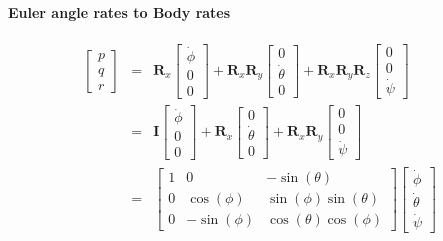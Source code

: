 \documentclass[a4paper,12pt]{article}
\begin{document}
\paragraph{Euler angle rates to Body rates}
\begin{equation} \nonumber
    \begin{aligned}
        \begin{bmatrix}
            p \\
            q \\
            r
        \end{bmatrix} & = &
        \mathbf{R}_x
        \begin{bmatrix}
            \dot{\phi} \\
            0 \\
            0
        \end{bmatrix} +
        \mathbf{R}_x
        \mathbf{R}_y
        \begin{bmatrix}
            0 \\
            \dot{\theta} \\
            0
        \end{bmatrix} +
        \mathbf{R}_x
        \mathbf{R}_y
        \mathbf{R}_z
        \begin{bmatrix}
            0 \\
            0 \\
            \dot{\psi}
        \end{bmatrix} \\
         & = &
        \mathbf{I}
        \begin{bmatrix}
            \dot{\phi} \\
            0 \\
            0
        \end{bmatrix} +
        \mathbf{R}_x
        \begin{bmatrix}
            0 \\
            \dot{\theta} \\
            0
        \end{bmatrix} +
        \mathbf{R}_x
        \mathbf{R}_y
        \begin{bmatrix}
            0 \\
            0 \\
            \dot{\psi}
        \end{bmatrix} \\
        & = & \begin{bmatrix}
            1 & 0 & -\sin(\theta) \\
            0 & \cos(\phi)  & \sin(\phi) \sin(\theta) \\
            0 & -\sin(\phi)          & \cos(\theta)\cos(\phi)
        \end{bmatrix}
        \begin{bmatrix}
            \dot{\phi} \\
            \dot{\theta} \\
            \dot{\psi}
        \end{bmatrix}
    \end{aligned}
\end{equation}
\end{document}
